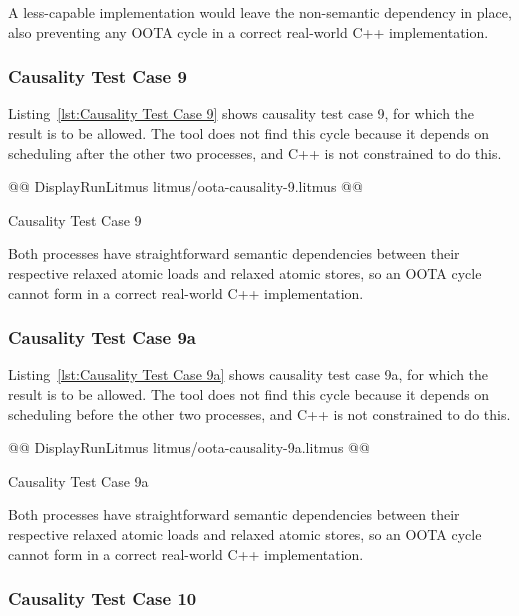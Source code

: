 \documentclass[10]{article}
\begin{document}
A less-capable implementation would leave the non-semantic dependency
in place, also preventing any OOTA cycle in a correct real-world C++
implementation.

\subsubsection{Causality Test Case 9}
\label{app:Causality Test Case 9}

Listing~\ref{lst:Causality Test Case 9}
shows causality test case 9, for which the 
result is to be allowed.
The  tool does not find this cycle because it depends on
scheduling  after the other two processes, and C++ is not
constrained to do this.

\begin{listing}[tbp]
@@ DisplayRunLitmus litmus/oota-causality-9.litmus @@
\caption{Causality Test Case 9}
\label{lst:Causality Test Case 9}
\end{listing}

Both processes have straightforward semantic dependencies between their
respective relaxed atomic loads and relaxed atomic stores, so an OOTA
cycle cannot form in a correct real-world C++ implementation.

\subsubsection{Causality Test Case 9a}
\label{app:Causality Test Case 9a}

Listing~\ref{lst:Causality Test Case 9a}
shows causality test case 9a, for which the 
result is to be allowed.
The  tool does not find this cycle because it depends on
scheduling  before the other two processes, and C++ is not
constrained to do this.

\begin{listing}[tbp]
@@ DisplayRunLitmus litmus/oota-causality-9a.litmus @@
\caption{Causality Test Case 9a}
\label{lst:Causality Test Case 9a}
\end{listing}

Both processes have straightforward semantic dependencies between their
respective relaxed atomic loads and relaxed atomic stores, so an OOTA
cycle cannot form in a correct real-world C++ implementation.

\subsubsection{Causality Test Case 10}
\label{app:Causality Test Case 10}
\end{document}
